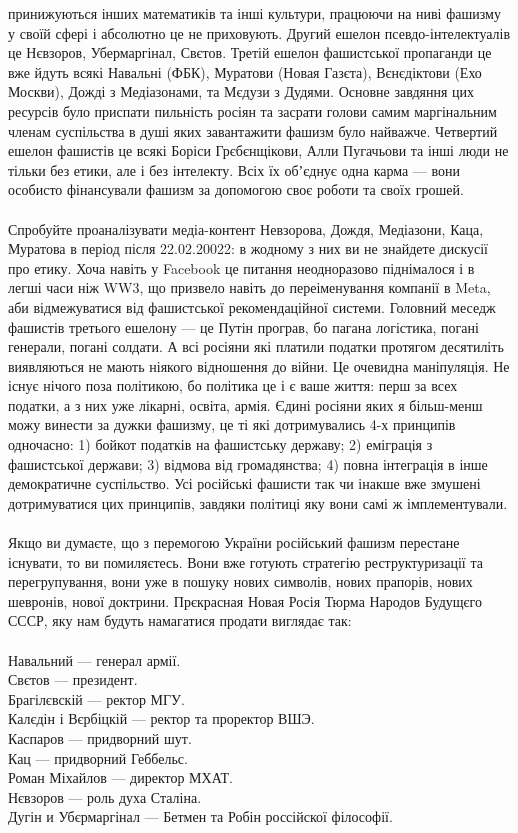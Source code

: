 принижуються інших математиків та інші культури, працюючи на ниві фашизму у
своїй сфері і абсолютно це не приховують. Другий ешелон псевдо-інтелектуалів
це Нєвзоров, Убермаргінал, Свєтов. Третій ешелон фашистської пропаганди це
вже йдуть всякі Навальні (ФБК), Муратови (Новая Газєта), Вєнєдіктови (Ехо Москви),
Дожді з Медіазонами, та Мєдузи з Дудями. Основне завдяння цих ресурсів було
приспати пильність росіян та засрати голови самим маргінальним членам суспільства
в душі яких завантажити фашизм було найважче. Четвертий ешелон фашистів це всякі
Боріси Грєбєнщікови, Алли Пугачьови та інші люди не тільки без етики, але і без
інтелекту. Всіх їх обʼєднує одна карма — вони особисто фінансували фашизм за
допомогою своє роботи та своїх грошей.
\\
\\
Спробуйте проаналізувати медіа-контент Невзорова, Дождя, Медіазони, Каца, Муратова
в період після 22.02.20022: в жодному з них ви не знайдете дискусії про етику.
Хоча навіть у Facebook це питання неодноразово піднімалося і в легші часи ніж
WW3, що призвело навіть до переіменування компанії в Meta, аби відмежуватися
від фашистської рекомендаційної системи. Головний меседж фашистів третього
ешелону --- це Путін програв, бо пагана логістика, погані генерали, погані
солдати. А всі росіяни які платили податки протягом десятиліть виявляються
не мають ніякого відношення до війни. Це очевидна маніпуляція. Не існує нічого
поза політикою, бо політика це і є ваше життя: перш за всех податки, а з них
уже лікарні, освіта, армія. Єдині росіяни яких я більш-менш можу винести за
дужки фашизму, це ті які дотримувались 4-х принципів одночасно: 1) бойкот
податків на фашистську державу; 2) еміграція з фашистської держави; 3)
відмова від громадянства; 4) повна інтеграція в інше демократичне суспільство.
Усі російські фашисти так чи інакше вже змушені дотримуватися цих принципів,
завдяки політиці яку вони самі ж імплементували.
\\
\\
Якщо ви думаєте, що з перемогою України російський фашизм перестане існувати,
то ви помиляєтесь. Вони вже готують стратегію реструктуризації та перегрупування,
вони уже в пошуку нових символів, нових прапорів, нових шевронів, нової доктрини.
Прєкрасная Новая Росія Тюрма Народов Будущєго СССР, яку нам будуть намагатися
продати виглядає так:
\\
\\
Навальний --- генерал армії.\\
Свєтов --- президент.\\
Брагілєвскій --- ректор МГУ.\\
Калєдін і Вєрбіцкій --- ректор та проректор ВШЭ.\\
Каспаров --- придворний шут.\\
Кац --- придворний Геббельс.\\
Роман Міхайлов --- директор МХАТ.\\
Нєвзоров --- роль духа Сталіна.\\
Дугін и Убєрмаргінал --- Бетмен та Робін россійскої філософії.\\

